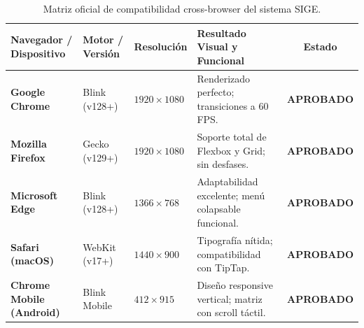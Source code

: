 \documentclass[12pt,a4paper]{article}
\begin{document}
\begin{table}[H]
\centering
\small
\renewcommand{\arraystretch}{1.2}
\begin{tabularx}{\textwidth}{|>{\bfseries}m{3.2cm}|m{2.5cm}|m{2.5cm}|X|c|}
\hline
\rowcolor{tableheader}
\textbf{Navegador / Dispositivo} & \textbf{Motor / Versión} & \textbf{Resolución} & \textbf{Resultado Visual y Funcional} & \textbf{Estado} \\
\hline
Google Chrome & Blink (v128+) & $1920 \times 1080$ & Renderizado perfecto; transiciones a 60 FPS. & \textbf{APROBADO} \\
\hline
Mozilla Firefox & Gecko (v129+) & $1920 \times 1080$ & Soporte total de Flexbox y Grid; sin desfases. & \textbf{APROBADO} \\
\hline
Microsoft Edge & Blink (v128+) & $1366 \times 768$ & Adaptabilidad excelente; menú colapsable funcional. & \textbf{APROBADO} \\
\hline
Safari (macOS) & WebKit (v17+) & $1440 \times 900$ & Tipografía nítida; compatibilidad con TipTap. & \textbf{APROBADO} \\
\hline
Chrome Mobile (Android) & Blink Mobile & $412 \times 915$ & Diseño responsive vertical; matriz con scroll táctil. & \textbf{APROBADO} \\
\hline
\end{tabularx}
\caption{Matriz oficial de compatibilidad cross-browser del sistema SIGE.}
\label{tab:cross_browser_matrix}
\end{table}
\end{document}
